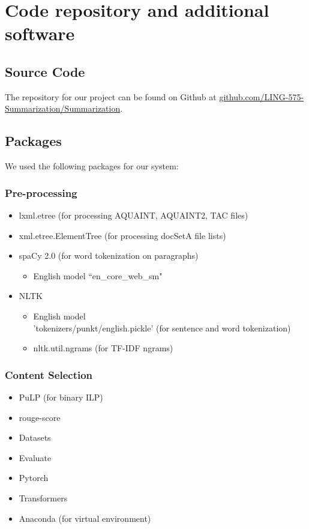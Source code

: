 
\section{Code repository and additional software}

\subsection{Source Code}

The repository for our project can be found on Github at \href{https://github.com/LING-575-Summarization/Summarization}{github.com/LING-575-Summarization/Summarization}.

\subsection{Packages}
We used the following packages for our system:

\subsubsection{Pre-processing}

\begin{itemize}
    \item lxml.etree (for processing AQUAINT, AQUAINT2, TAC files)
    \item xml.etree.ElementTree (for processing docSetA file lists)
    \item spaCy 2.0 (for word tokenization on paragraphs)
    \begin{itemize}
        \item English model ``en\_core\_web\_sm"
    \end{itemize}
    \item NLTK 
    \begin{itemize}
        \item English model \\ 
        'tokenizers/punkt/english.pickle' (for sentence and word tokenization)
        \item nltk.util.ngrams (for TF-IDF ngrams)
    \end{itemize}
\end{itemize}

\subsubsection{Content Selection}

\begin{itemize}
    \item PuLP (for binary ILP)
    \item rouge-score
    \item Datasets
    \item Evaluate
    \item Pytorch
    \item Transformers
    \item Anaconda (for virtual environment)
\end{itemize}

